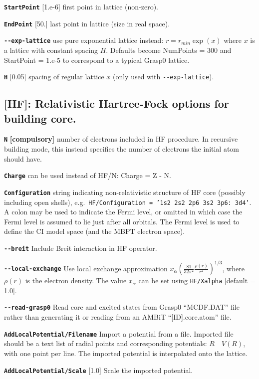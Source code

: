 \documentclass[a4paper,11pt]{article}
\newcommand{\option}[1]{\smallskip\noindent\textbf{\texttt{#1}}}
\newcommand{\code}[1]{\texttt{#1}}
\begin{document}
\option{StartPoint} [1.e-6] first point in lattice (non-zero).

\option{EndPoint} [50.] last point in lattice (size in real space).

\option{-{}-exp-lattice} use pure exponential lattice instead: $r = r_{min}\exp(x)$ where $x$ is a lattice with constant spacing $H$. Defaults become NumPoints = 300 and StartPoint = 1.e-5 to correspond to a typical Grasp0 lattice.

\option{H} [0.05] spacing of regular lattice $x$ (only used with \texttt{-{}-exp-lattice}).

\subsection{[HF]: Relativistic Hartree-Fock options for building core.}

\option{N} \textbf{[compulsory]} number of electrons included in HF procedure. In recursive building mode, this instead specifies the number of electrons the initial atom should have.

\option{Charge} can be used instead of HF/N: Charge = Z - N.

\option{Configuration} string indicating non-relativistic structure of HF core (possibly including open shells), e.g.~\texttt{HF/Configuration = '1s2 2s2 2p6 3s2 3p6: 3d4'}. A colon may be used to indicate the Fermi level, or omitted in which case the Fermi level is assumed to lie just after all orbitals. The Fermi level is used to define the CI model space (and the MBPT electron space).

\option{-{}-breit} Include Breit interaction in HF operator.

\option{-{}-local-exchange} Use local exchange approximation $x_\alpha \left(\frac{81}{32\pi^2} \frac{\rho(r)}{r^2}\right)^{1/3}$, where $\rho(r)$ is the electron density. The value $x_\alpha$ can be set using \code{HF/Xalpha} [default = 1.0].

\option{-{}-read-grasp0} Read core and excited states from Grasp0 ``MCDF.DAT'' file rather than generating it or reading from an AMBiT ``[ID].core.atom'' file.

\option{AddLocalPotential/Filename} Import a potential from a file. Imported file should be a text list of radial points and corresponding potentials: $R \quad V(R)$, with one point per line. The imported potential is interpolated onto the lattice.

\option{AddLocalPotential/Scale} [1.0] Scale the imported potential.
\end{document}
